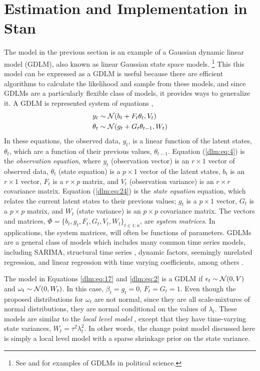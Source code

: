 \section{Estimation and Implementation in Stan}
\label{dlm:sec:estimation}

The model in the previous section is an example of a Gaussian dynamic linear model (GDLM), also known as linear Gaussian state space models.%
\footnote{See \textcite{Beck1989} and \textcite{MartinQuinn2002} for examples of GDLMs in political science.}
This this model can be expressed as a GDLM is useful because there are efficient algorithms to calculate the likelihood and sample from these models, and since GDLMs are a particularly flexible class of models, it provides ways to generalize it.
A GDLM is represented system of equations \parencites{DurbinKoopman2012}{WestHarrison1997}{PetrisPetroneEtAl2009}[Ch 6]{ShumwayStoffer2010},
\begin{align}
  \label{dlm:eq:4}
  y_{t} &\sim \mathcal{N}\mathopen{}\left(b_{t} + F_{t} \theta_{t}, V_{t}\right)\mathclose{} \\
  \label{dlm:eq:24}
  \theta_{t} &\sim \mathcal{N}\mathopen{}\left(g_{t} + G_{t} \theta_{t - 1}, W_{t}\right)\mathclose{} 
\end{align}
In these equations, the observed data, $y_{t}$, is a linear function of the latent states, $\theta_{t}$, which are a function of their previous values, $\theta_{t-1}$.
Equation (\ref{dlm:eq:4}) is the \textit{observation equation}, where $y_{t}$ (observation vector) is an $r \times 1$ vector of observed data, $\theta_{t}$ (state equation) is a $p \times 1$ vector of the latent states, $b_{t}$ is an $r \times 1$ vector, $F_{t}$ is a $r \times p$ matrix, and $V_{t}$ (observation variance) is an $r \times r$ covariance matrix.
Equation (\ref{dlm:eq:24}) is the \textit{state equation} equation, which relates the current latent states to their previous values; $g_{t}$ is a $p \times 1$ vector, $G_{t}$ is a $p \times p$ matrix, and $W_{t}$ (state variance) is an $p \times p$ covariance matrix.
The vectors and matrices, $\Phi = \{ b_{t}, g_{t}, F_{t}, G_{t}, V_{t}, W_{t} \}_{t \in 1:n}$, are \textit{system matrices}.
In applications, the system matrices, will often be functions of parameters.
GDLMs are a general class of models which includes many common time series models, including SARIMA, structural time series \parencite{Harvey1990}, dynamic factors, seemingly unrelated regression, and linear regression with time varying coefficients, among others \parencite[Ch. 3]{DurbinKoopman2012}. 

The model in Equations \eqref{dlm:eq:17} and \eqref{dlm:eq:2} is a GDLM if $\epsilon_{t} \sim \mathcal{N}\mathopen{}\left(0, V\right)\mathclose{}$ and $\omega_{t} \sim \mathcal{N}\mathopen{}\left(0, W_{t}\right)\mathclose{}$.
In this case, $\beta_{t} = g_{t} = 0$, $F_{t} = G_{t} = 1$.
Even though the proposed distributions for $\omega_{t}$ are not normal, since they are all scale-mixtures of normal distributions, they are normal conditional on the values of $\lambda_{t}$.%
These models are similar to the \textit{local level model} \parencite[Ch 2.]{DurbinKoopman2012}, except that they have time-varying state variances, $W_{t} = \tau^2 \lambda^2_t$.
In other words, the change point model discussed here is simply a local level model with a sparse shrinkage prior on the state variance.

